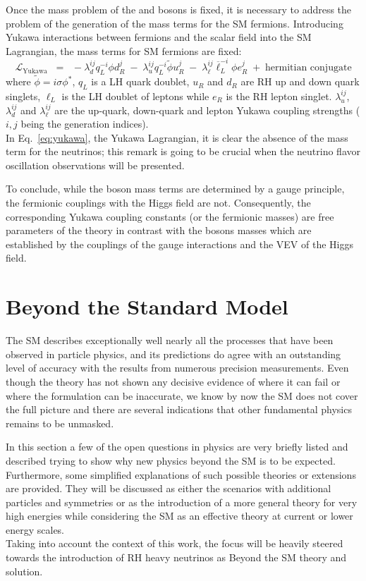 Once the mass problem of the \PW and \PZ bosons is fixed, it is necessary to address the problem of the generation of the mass terms for the SM fermions. Introducing Yukawa interactions between fermions and the scalar field into the SM Lagrangian, the mass terms for SM fermions are fixed:
\begin{equation}
\label{eq:yukawa}
 \mathcal{L}_{\text{Yukawa}} \;\; = \;\; -\lambda^{ij}_dq^{-i}_L\phi d^j_R \;-\; \lambda^{ij}_uq^{-i}_L\tilde{\phi} u^j_R \;-\; \lambda^{ij}_{\ell}\overline{\ell}^{-i}_L\phi e^j_R \;+\; \text{hermitian conjugate}
\end{equation}
where $\tilde{\phi}= i\sigma\phi^*$, $q_L$ is a LH quark doublet, $u_R$ and $d_R$ are RH up and down quark singlets, $\ell_L$ is the LH doublet of leptons while $e_R$ is the RH lepton singlet. $\lambda^{ij}_u$, $\lambda^{ij}_d$ and $\lambda^{ij}_\ell$ are the up-quark, down-quark and lepton Yukawa coupling strengths ($i,j$ being the generation indices). \\
In Eq.~\ref{eq:yukawa}, the Yukawa Lagrangian, it is clear the absence of the mass term for the neutrinos; this remark is going to be crucial when the neutrino flavor oscillation observations will be presented.

To conclude, while the boson mass terms are determined by a gauge principle, the fermionic couplings with the Higgs field are not. Consequently, the corresponding Yukawa coupling constants (or the fermionic masses) are free parameters of the theory in contrast with the bosons masses which 
 are established by the couplings of the gauge interactions and the VEV of the Higgs field.



\section{Beyond the Standard Model}\label{sec:bsm}
The SM describes exceptionally well nearly all the processes that have been observed in particle physics, and its predictions do agree with an outstanding level of accuracy with the results from numerous precision measurements. Even though the theory has not shown any decisive evidence of where it can fail or where the formulation can be inaccurate, we know by now the SM does not cover the full picture and there are several indications that other fundamental physics remains to be unmasked.

In this section a few of the open questions in physics are very briefly listed and described trying to show why new physics beyond the SM is to be expected. Furthermore, some simplified explanations of such possible theories or extensions are provided. They will be discussed as either the scenarios with additional particles and symmetries or as the introduction of a more general theory for very high energies while considering the SM as an effective theory at current or lower energy scales.\\
Taking into account the context of this work, the focus will be heavily steered towards the introduction of RH heavy neutrinos as Beyond the SM theory and solution.



